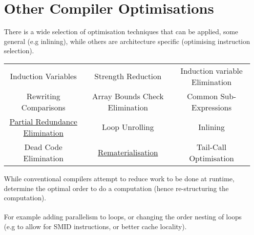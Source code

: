 \documentclass{report}
\begin{document}
\section*{Other Compiler Optimisations}
There is a wide selection of optimisation techniques that can be applied, some general (e.g inlining), while others are architecture specific (optimising instruction selection).
\begin{center}
	\begin{tabular}{c c c}
		Induction Variables                                                                                 & Strength Reduction                                                        & Induction variable Elimination \\
		Rewriting Comparisons                                                                               & Array Bounds Check Elimination                                            & Common Sub-Expressions         \\
		\href{https://en.wikipedia.org/wiki/Partial_redundancy_elimination}{Partial Redundance Elimination} & Loop Unrolling                                                            & Inlining                       \\
		Dead Code Elimination                                                                               & \href{https://en.wikipedia.org/wiki/Rematerialization}{Rematerialisation} & Tail-Call Optimisation         \\
	\end{tabular}
\end{center}
While conventional compilers attempt to reduce work to be done at runtime,  determine the optimal order to do a computation (hence re-structuring the computation).
\\
\\ For example adding parallelism to loops, or changing the order nesting of loops (e.g to allow for SMID instructions, or better cache locality).
\end{document}
